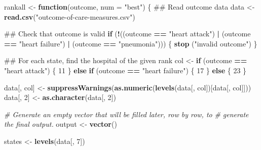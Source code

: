 \documentclass[]{article}
\newenvironment{Shaded}{\begin{snugshade}}{\end{snugshade}}
\newcommand{\KeywordTok}[1]{\textcolor[rgb]{0.13,0.29,0.53}{\textbf{#1}}}
\newcommand{\DataTypeTok}[1]{\textcolor[rgb]{0.13,0.29,0.53}{#1}}
\newcommand{\DecValTok}[1]{\textcolor[rgb]{0.00,0.00,0.81}{#1}}
\newcommand{\StringTok}[1]{\textcolor[rgb]{0.31,0.60,0.02}{#1}}
\newcommand{\CommentTok}[1]{\textcolor[rgb]{0.56,0.35,0.01}{\textit{#1}}}
\newcommand{\ControlFlowTok}[1]{\textcolor[rgb]{0.13,0.29,0.53}{\textbf{#1}}}
\newcommand{\OperatorTok}[1]{\textcolor[rgb]{0.81,0.36,0.00}{\textbf{#1}}}
\newcommand{\NormalTok}[1]{#1}
\begin{document}
\begin{Shaded}
\begin{Highlighting}[]
\NormalTok{rankall <-}\StringTok{ }\ControlFlowTok{function}\NormalTok{(outcome, }\DataTypeTok{num =} \StringTok{"best"}\NormalTok{) \{}
\NormalTok{        ## Read outcome data}
\NormalTok{        data <-}\StringTok{ }\KeywordTok{read.csv}\NormalTok{(}\StringTok{"outcome-of-care-measures.csv"}\NormalTok{)}
        
\NormalTok{        ## Check that outcome is valid}
        \ControlFlowTok{if}\NormalTok{ (}\OperatorTok{!}\NormalTok{((outcome }\OperatorTok{==}\StringTok{ "heart attack"}\NormalTok{) }\OperatorTok{|}\StringTok{ }\NormalTok{(outcome }\OperatorTok{==}\StringTok{ "heart failure"}\NormalTok{)}
              \OperatorTok{|}\StringTok{ }\NormalTok{(outcome }\OperatorTok{==}\StringTok{ "pneumonia"}\NormalTok{))) \{}
                \KeywordTok{stop}\NormalTok{ (}\StringTok{"invalid outcome"}\NormalTok{)}
\NormalTok{        \}}

\NormalTok{        ## For each state, find the hospital of the given rank}
\NormalTok{        col <-}\StringTok{ }\ControlFlowTok{if}\NormalTok{ (outcome }\OperatorTok{==}\StringTok{ "heart attack"}\NormalTok{) \{}
                \DecValTok{11}
\NormalTok{        \} }\ControlFlowTok{else} \ControlFlowTok{if}\NormalTok{ (outcome }\OperatorTok{==}\StringTok{ "heart failure"}\NormalTok{) \{}
                \DecValTok{17}
\NormalTok{        \} }\ControlFlowTok{else}\NormalTok{ \{}
                \DecValTok{23}
\NormalTok{        \}}
        
\NormalTok{        data[, col] <-}\StringTok{ }\KeywordTok{suppressWarnings}\NormalTok{(}\KeywordTok{as.numeric}\NormalTok{(}\KeywordTok{levels}\NormalTok{(data[, col])[data[, col]]))}
\NormalTok{        data[, }\DecValTok{2}\NormalTok{] <-}\StringTok{ }\KeywordTok{as.character}\NormalTok{(data[, }\DecValTok{2}\NormalTok{])}
        
        \CommentTok{# Generate an empty vector that will be filled later, row by row, to }
        \CommentTok{# generate the final output.}
\NormalTok{        output <-}\StringTok{ }\KeywordTok{vector}\NormalTok{()}
        
\NormalTok{        states <-}\StringTok{ }\KeywordTok{levels}\NormalTok{(data[, }\DecValTok{7}\NormalTok{])}
        

\end{Highlighting}
\end{Shaded}
\end{document}

